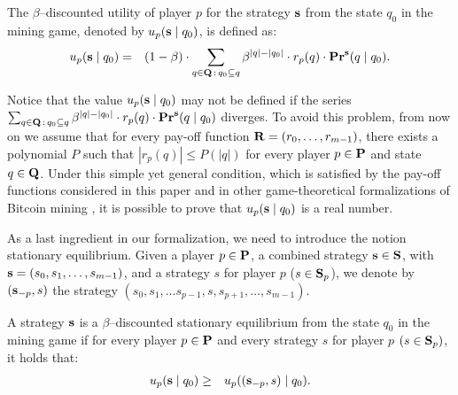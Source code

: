 \begin{mydef}
\label{def-utility}
The $\beta$--discounted utility of player $p$ for the strategy $\mathbf{s}$ from the state $q_0$ in
the mining game, denoted by $u_p(\mathbf{s} \mid q_0)$, is defined as:
\begin{eqnarray*}
u_p(\mathbf{s} \mid q_0) & = & (1 - \beta) \cdot  \sum_{q \in \mathbf{Q} \,:\, q_0 \subseteq q} \beta^{|q|-|q_0|} \cdot  r_p(q) \cdot \mathbf{Pr}^{\mathbf{s}}(q \mid q_0).
\end{eqnarray*}
\end{mydef}
Notice that the value $u_p(\mathbf{s} \mid q_0)$ may not be defined if the series $\sum_{q \in \mathbf{Q} \,:\, q_0 \subseteq q} \beta^{|q|-|q_0|} \cdot  r_p(q) \cdot \mathbf{Pr}^{\mathbf{s}}(q \mid q_0)$ diverges. To avoid this problem, from now on we assume that for every pay-off function $\mathbf{R} = (r_0, \ldots, r_{m-1})$, there exists a polynomial $P$ such that $|r_p(q)| \leq P(|q|)$ for every player $p \in \mathbf{P}$ and state $q \in \mathbf{Q}$. Under this simple yet general condition, which is satisfied by the pay-off functions considered in this paper and in other game-theoretical formalizations of Bitcoin mining \cite{mininggames:2016}, it is possible to prove that $u_p(\mathbf{s} \mid q_0)$ is a real number. 

As a last ingredient in our formalization, we need to introduce the notion stationary equilibrium.
Given a player $p \in \mathbf{P}$, a combined strategy $\mathbf{s} \in \mathbf{S}$, with $\mathbf{s} = (s_0,s_1, \ldots, s_{m-1})$, and a strategy $s$ for player $p$ ($s \in \mathbf{S}_p$), we denote by $(\mathbf{s}_{-p}, s)$ the strategy $(s_0, s_1, \ldots s_{p-1},s,s_{p+1}, \ldots, s_{m-1})$.
\begin{mydef}
A strategy $\mathbf{s}$ is a $\beta$--discounted stationary equilibrium from the state $q_0$ in  the %
mining game if for every player $p \in \mathbf{P}$ and every strategy $s$ for player $p$ $(s \in\mathbf{S}_p)$, it holds that:
\begin{eqnarray*}u_p(\mathbf{s} \mid q_0)  & \geq  & u_p ((\mathbf{s}_{-p},s) \mid q_0).
\end{eqnarray*}
\end{mydef}

